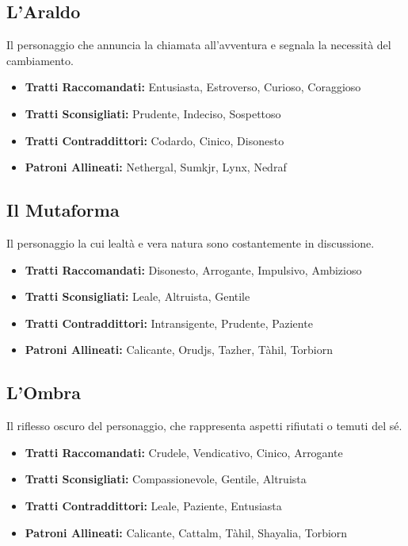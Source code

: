 \begin{multicols}{2}
\subsection*{L'Araldo}
Il personaggio che annuncia la chiamata all'avventura e segnala la necessità del cambiamento.

\noindent\begin{itemize}[leftmargin=*] \setlength{\itemsep}{0pt}
\item \textbf{Tratti Raccomandati:} Entusiasta, Estroverso, Curioso, Coraggioso
\item \textbf{Tratti Sconsigliati:} Prudente, Indeciso, Sospettoso
\item \textbf{Tratti Contraddittori:} Codardo, Cinico, Disonesto
\item \textbf{Patroni Allineati:} Nethergal, Sumkjr, Lynx, Nedraf
\end{itemize}

\subsection*{Il Mutaforma}
Il personaggio la cui lealtà e vera natura sono costantemente in discussione.

\noindent\begin{itemize}[leftmargin=*] \setlength{\itemsep}{0pt}
\item \textbf{Tratti Raccomandati:} Disonesto, Arrogante, Impulsivo, Ambizioso
\item \textbf{Tratti Sconsigliati:} Leale, Altruista, Gentile
\item \textbf{Tratti Contraddittori:} Intransigente, Prudente, Paziente
\item \textbf{Patroni Allineati:} Calicante, Orudjs, Tazher, Tàhil, Torbiorn
\end{itemize}

\subsection*{L'Ombra}
Il riflesso oscuro del personaggio, che rappresenta aspetti rifiutati o temuti del sé.

\noindent\begin{itemize}[leftmargin=*] \setlength{\itemsep}{0pt}
\item \textbf{Tratti Raccomandati:} Crudele, Vendicativo, Cinico, Arrogante
\item \textbf{Tratti Sconsigliati:} Compassionevole, Gentile, Altruista
\item \textbf{Tratti Contraddittori:} Leale, Paziente, Entusiasta
\item \textbf{Patroni Allineati:} Calicante, Cattalm, Tàhil, Shayalia, Torbiorn
\end{itemize}


\end{multicols}
